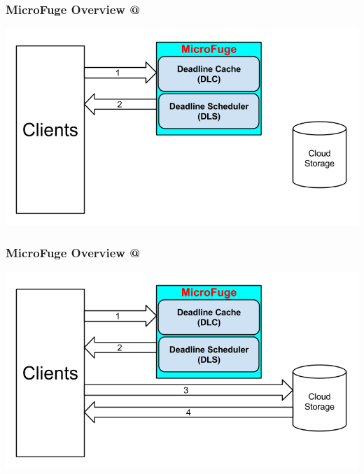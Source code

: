 \documentclass{beamer}
\makeatletter
\newcommand*{\rom}[1]{\expandafter\@slowromancap\romannumeral #1@}
\makeatother
\begin{document}
\begin{frame}
  \frametitle{MicroFuge Overview \rom{2}}
  \begin{center}
    \includegraphics[scale=0.39]{img/MF_FULL_V8_3.png}
  \end{center}
\end{frame}

\begin{frame}
  \frametitle{MicroFuge Overview \rom{3}}
  \begin{center}
    \includegraphics[scale=0.39]{img/MF_FULL_V8_4.png}
  \end{center}
\end{frame}
\end{document}
